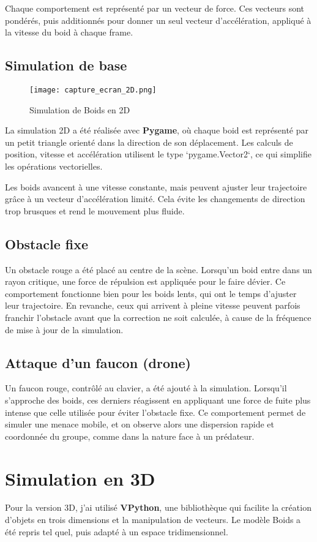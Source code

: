 \documentclass{article}
\begin{document}
Chaque comportement est représenté par un vecteur de force. Ces vecteurs sont pondérés, puis additionnés pour donner un seul vecteur d’accélération, appliqué à la vitesse du boid à chaque frame.

\subsection{Simulation de base}
\begin{figure}
    \centering
    \texttt{[image: capture\_ecran\_2D.png]}
    \caption{Simulation de Boids en 2D}
    \label{fig:enter-label}
\end{figure}
La simulation 2D a été réalisée avec \textbf{Pygame}, où chaque boid est représenté par un petit triangle orienté dans la direction de son déplacement. Les calculs de position, vitesse et accélération utilisent le type `pygame.Vector2`, ce qui simplifie les opérations vectorielles.

Les boids avancent à une vitesse constante, mais peuvent ajuster leur trajectoire grâce à un vecteur d’accélération limité. Cela évite les changements de direction trop brusques et rend le mouvement plus fluide.
\subsection{Obstacle fixe}
Un obstacle rouge a été placé au centre de la scène. Lorsqu’un boid entre dans un rayon critique, une force de répulsion est appliquée pour le faire dévier. Ce comportement fonctionne bien pour les boids lents, qui ont le temps d’ajuster leur trajectoire. En revanche, ceux qui arrivent à pleine vitesse peuvent parfois franchir l’obstacle avant que la correction ne soit calculée, à cause de la fréquence de mise à jour de la simulation.
\subsection{Attaque d'un faucon (drone)}
Un faucon rouge, contrôlé au clavier, a été ajouté à la simulation. Lorsqu’il s’approche des boids, ces derniers réagissent en appliquant une force de fuite plus intense que celle utilisée pour éviter l’obstacle fixe. Ce comportement permet de simuler une menace mobile, et on observe alors une dispersion rapide et coordonnée du groupe, comme dans la nature face à un prédateur.

\section{Simulation en 3D}
Pour la version 3D, j’ai utilisé \textbf{VPython}, une bibliothèque qui facilite la création d’objets en trois dimensions et la manipulation de vecteurs. Le modèle Boids a été repris tel quel, puis adapté à un espace tridimensionnel.
\end{document}
